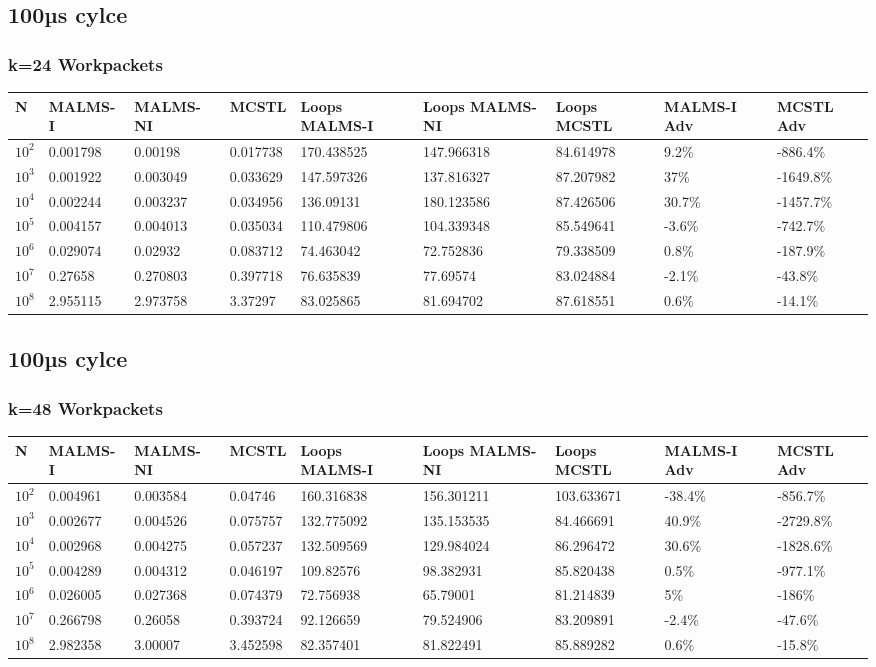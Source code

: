 \documentclass[landscape]{article}
\begin{document}
\subsection*{100µs cylce}
\subsubsection{k=24 Workpackets}
\begin{tabular}{l|l|l|l|l|l|l|l|l}
N	& MALMS-I 	& MALMS-NI	& MCSTL		& Loops MALMS-I	& Loops MALMS-NI & Loops MCSTL & MALMS-I Adv	& MCSTL Adv		\\
\hline
$10^2$		& 0.001798	& 0.00198	& 0.017738	& 170.438525	& 147.966318	& 84.614978	& 9.2\%  	& -886.4\% \\
$10^3$		& 0.001922	& 0.003049	& 0.033629	& 147.597326	& 137.816327	& 87.207982	& 37\%  	& -1649.8\% \\
$10^4$		& 0.002244	& 0.003237	& 0.034956	& 136.09131	& 180.123586	& 87.426506	& 30.7\%  	& -1457.7\% \\
$10^5$		& 0.004157	& 0.004013	& 0.035034	& 110.479806	& 104.339348	& 85.549641	& -3.6\%  	& -742.7\% \\
$10^6$		& 0.029074	& 0.02932	& 0.083712	& 74.463042	& 72.752836	& 79.338509	& 0.8\%  	& -187.9\% \\
$10^7$		& 0.27658	& 0.270803	& 0.397718	& 76.635839	& 77.69574	& 83.024884	& -2.1\%  	& -43.8\% \\
$10^8$		& 2.955115	& 2.973758	& 3.37297	& 83.025865	& 81.694702	& 87.618551	& 0.6\%  	& -14.1\% \\
\end{tabular}
\subsection*{100µs cylce}
\subsubsection{k=48 Workpackets}
\begin{tabular}{l|l|l|l|l|l|l|l|l}
N	& MALMS-I 	& MALMS-NI	& MCSTL		& Loops MALMS-I	& Loops MALMS-NI & Loops MCSTL & MALMS-I Adv	& MCSTL Adv		\\
\hline
$10^2$		& 0.004961	& 0.003584	& 0.04746	& 160.316838	& 156.301211	& 103.633671	& -38.4\%  	& -856.7\% \\
$10^3$		& 0.002677	& 0.004526	& 0.075757	& 132.775092	& 135.153535	& 84.466691	& 40.9\%  	& -2729.8\% \\
$10^4$		& 0.002968	& 0.004275	& 0.057237	& 132.509569	& 129.984024	& 86.296472	& 30.6\%  	& -1828.6\% \\
$10^5$		& 0.004289	& 0.004312	& 0.046197	& 109.82576	& 98.382931	& 85.820438	& 0.5\%  	& -977.1\% \\
$10^6$		& 0.026005	& 0.027368	& 0.074379	& 72.756938	& 65.79001	& 81.214839	& 5\%  	& -186\% \\
$10^7$		& 0.266798	& 0.26058	& 0.393724	& 92.126659	& 79.524906	& 83.209891	& -2.4\%  	& -47.6\% \\
$10^8$		& 2.982358	& 3.00007	& 3.452598	& 82.357401	& 81.822491	& 85.889282	& 0.6\%  	& -15.8\% \\
\end{tabular}
\end{document}

